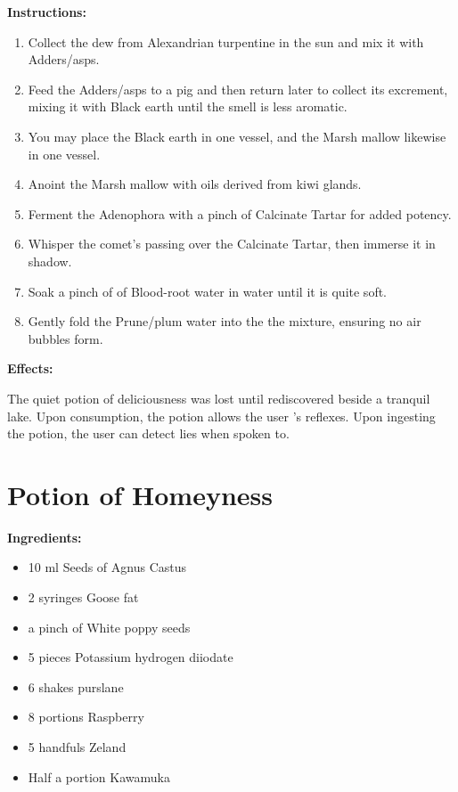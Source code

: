 \documentclass{article}
\begin{document}
\textbf{Instructions:}

\begin{enumerate}
  \item Collect the dew from Alexandrian turpentine in the sun and mix it with Adders/asps.
  \item Feed the Adders/asps to a pig and then return later to collect its excrement, mixing it with Black earth until the smell is less aromatic.
  \item You may place the Black earth in one vessel, and the Marsh mallow likewise in one vessel.
  \item Anoint the Marsh mallow with oils derived from kiwi glands.
  \item Ferment the Adenophora with a pinch of Calcinate Tartar for added potency.
  \item Whisper the comet’s passing over the Calcinate Tartar, then immerse it in shadow.
  \item Soak a pinch of of Blood-root water in water until it is quite soft.
  \item Gently fold the Prune/plum water into the the mixture, ensuring no air bubbles form.
\end{enumerate}

\textbf{Effects:}

The quiet potion of deliciousness was lost until rediscovered beside a tranquil lake. Upon consumption, the potion allows the user 's reflexes. Upon ingesting the potion, the user can detect lies when spoken to.

\newpage
\section*{Potion of Homeyness}

\textbf{Ingredients:}

\begin{itemize}
  \item 10 ml Seeds of Agnus Castus
  \item 2 syringes Goose fat
  \item a pinch of White poppy seeds
  \item 5 pieces Potassium hydrogen diiodate
  \item 6 shakes purslane
  \item 8 portions Raspberry
  \item 5 handfuls Zeland
  \item Half a portion Kawamuka
\end{itemize}
\end{document}

